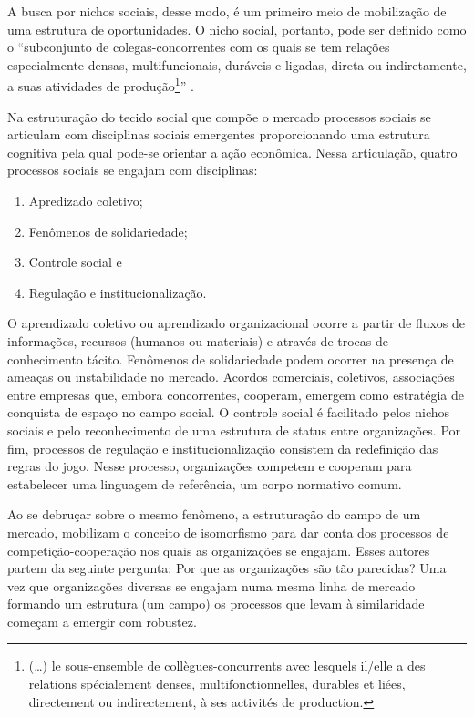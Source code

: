 \documentclass[a4paper, 12pt, openright, oneside, german, french, english, brazil]{abntex2}
\begin{document}
	A busca por nichos sociais, desse modo, é um primeiro meio de mobilização de uma estrutura de oportunidades. O nicho social, portanto, pode ser definido como o ``subconjunto de colegas-concorrentes com os quais se tem relações especialmente densas, multifuncionais, duráveis e ligadas, direta ou indiretamente, a suas atividades de produção\footnote{(\dots) le sous-ensemble de collègues-concurrents avec lesquels il/elle a des relations spécialement denses, multifonctionnelles, durables et liées, directement ou indirectement, à ses activités de production.}'' \cite[p. 575]{lazega2009theorie}.
	
	Na estruturação do tecido social que compõe o mercado processos sociais se articulam com disciplinas sociais emergentes proporcionando uma estrutura cognitiva pela qual pode-se orientar a ação econômica. Nessa articulação, quatro processos sociais se engajam com disciplinas:
	
	\begin{enumerate}
		\item Apredizado coletivo;
		\item Fenômenos de solidariedade;
		\item Controle social e
		\item Regulação e institucionalização.
	\end{enumerate}
	
	O aprendizado coletivo ou aprendizado organizacional ocorre a partir de fluxos de informações, recursos (humanos ou materiais) e através de trocas de conhecimento tácito. Fenômenos de solidariedade podem ocorrer na presença de ameaças ou instabilidade no mercado. Acordos comerciais, coletivos, associações entre empresas que, embora concorrentes, cooperam, emergem como estratégia de conquista de espaço no campo social. O controle social é facilitado pelos nichos sociais e pelo reconhecimento de uma estrutura de status entre organizações. Por fim, processos de regulação e institucionalização consistem da redefinição das regras do jogo. Nesse processo, organizações competem e cooperam para estabelecer uma linguagem de referência, um corpo normativo comum.
	
	Ao se debruçar sobre o mesmo fenômeno, a estruturação do campo de um mercado,  mobilizam o conceito de isomorfismo para dar conta dos processos de competição-cooperação nos quais as organizações se engajam. Esses autores partem da seguinte pergunta: Por que as organizações são tão parecidas? Uma vez que organizações diversas se engajam numa mesma linha de mercado formando um estrutura (um campo) os processos que levam à similaridade começam a emergir com robustez. 
	
\end{document}
